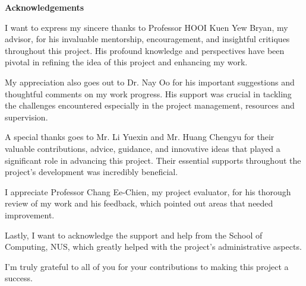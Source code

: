 \begin{spacing}{2}
\thispagestyle{plain}
\begin{center}
    \Large
    \textbf{Acknowledgements}
\end{center}
I want to express my sincere thanks to Professor HOOI Kuen Yew Bryan, my advisor, for his invaluable mentorship, encouragement, and insightful critiques throughout this project. His profound knowledge and perspectives have been pivotal in refining the idea of this project and enhancing my work.

My appreciation also goes out to Dr. Nay Oo for his important suggestions and thoughtful comments on my work progress. His support was crucial in tackling the challenges encountered especially in the project management, resources and supervision.

A special thanks goes to Mr. Li Yuexin and Mr. Huang Chengyu for their valuable contributions, advice, guidance, and innovative ideas that played a significant role in advancing this project. Their essential supports throughout the project's development was incredibly beneficial.

I appreciate Professor Chang Ee-Chien, my project evaluator, for his thorough review of my work and his feedback, which pointed out areas that needed improvement.

Lastly, I want to acknowledge the support and help from the School of Computing, NUS, which greatly helped with the project's administrative aspects.

I'm truly grateful to all of you for your contributions to making this project a success.
\pagebreak
\end{spacing}